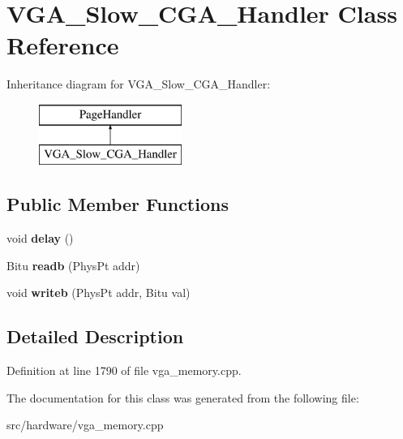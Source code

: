 \hypertarget{classVGA__Slow__CGA__Handler}{\section{V\-G\-A\-\_\-\-Slow\-\_\-\-C\-G\-A\-\_\-\-Handler Class Reference}
\label{classVGA__Slow__CGA__Handler}
}
Inheritance diagram for V\-G\-A\-\_\-\-Slow\-\_\-\-C\-G\-A\-\_\-\-Handler\-:\begin{figure}[H]
\begin{center}
\leavevmode
\includegraphics[height=2.000000cm]{classVGA__Slow__CGA__Handler}
\end{center}
\end{figure}
\subsection*{Public Member Functions}
\begin{DoxyCompactItemize}
\item 
\hypertarget{classVGA__Slow__CGA__Handler_af8dd584b1fbb765acffe039b47f21181}{void {\bfseries delay} ()}\label{classVGA__Slow__CGA__Handler_af8dd584b1fbb765acffe039b47f21181}

\item 
\hypertarget{classVGA__Slow__CGA__Handler_a0724a16ab5641b5436d5505a81438d47}{Bitu {\bfseries readb} (Phys\-Pt addr)}\label{classVGA__Slow__CGA__Handler_a0724a16ab5641b5436d5505a81438d47}

\item 
\hypertarget{classVGA__Slow__CGA__Handler_a26591aafbb6125366d6e5607ae330077}{void {\bfseries writeb} (Phys\-Pt addr, Bitu val)}\label{classVGA__Slow__CGA__Handler_a26591aafbb6125366d6e5607ae330077}

\end{DoxyCompactItemize}


\subsection{Detailed Description}


Definition at line 1790 of file vga\-\_\-memory.\-cpp.



The documentation for this class was generated from the following file\-:\begin{DoxyCompactItemize}
\item 
src/hardware/vga\-\_\-memory.\-cpp\end{DoxyCompactItemize}
